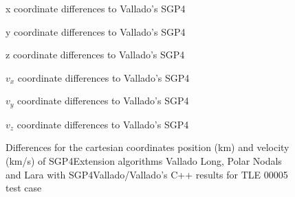 \documentclass{article}
\begin{document}
\begin{figure}
  \begin{minipage}[b]{.48\linewidth}
    \centering
  
    \centerline{x coordinate differences to Vallado's SGP4}\medskip
  \end{minipage}
  \hfill
  \begin{minipage}[b]{0.48\linewidth}
      \centering
      
  \centerline{y coordinate differences to Vallado's SGP4}\medskip
  \end{minipage}
  \hfill
  \begin{minipage}[b]{0.48\linewidth}
    \centering
      
  \centerline{z coordinate differences to Vallado's SGP4}\medskip
  \end{minipage}
  \hfill
  \begin{minipage}[b]{0.48\linewidth}
    \centering
      
    \centerline{$v_x$ coordinate differences to Vallado's SGP4}\medskip
  \end{minipage}
  \hfill
  \begin{minipage}[b]{0.48\linewidth}
    \centering
      
    \centerline{$v_y$ coordinate differences to Vallado's SGP4}\medskip
  \end{minipage}
  \hfill
  \begin{minipage}[b]{0.48\linewidth}
    \centering
      
    \centerline{$v_z$ coordinate differences to Vallado's SGP4}\medskip
  \end{minipage}
  \caption{Differences for the cartesian coordinates position (km) and velocity (km/s) of SGP4Extension algorithms Vallado Long, Polar Nodals and Lara with SGP4Vallado/Vallado's C++ results for TLE 00005 test case}
\label{fig:pv0005}
\end{figure}
\end{document}
